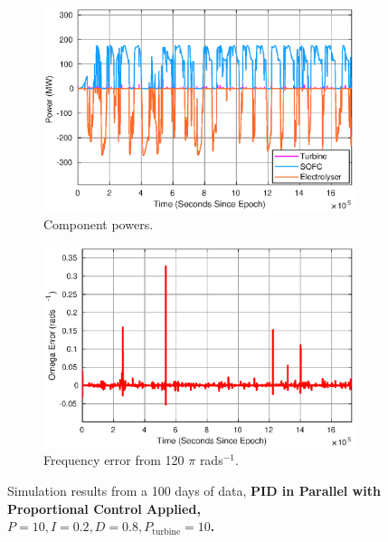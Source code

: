 \begin{figure}[ht]
\centering
\begin{subfigure}{.5\textwidth}
  \centering
  \includegraphics[width=1\linewidth]{images/results/PID/power.eps}
  \caption{Component powers.}
  \label{fig:piduse}
\end{subfigure}%
\begin{subfigure}{.5\textwidth}
  \centering
  \includegraphics[width=1\linewidth]{images/results/PID/omega.eps}
  \caption{Frequency error from 120 $\pi$ rads$^{-1}$.}
  \label{fig:pidpower}
\end{subfigure}
\caption{Simulation results from a 100 days of data, {\bf PID in Parallel with Proportional Control Applied, $P= 10,I= 0.2,D= 0.8, P_{\mathrm{turbine}} = 10$.}}
\label{fig:power-PID-sim}
\end{figure}









